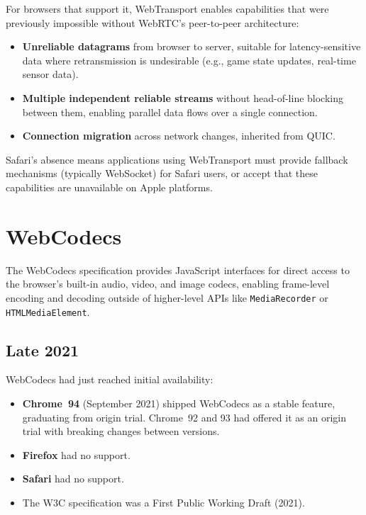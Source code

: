 \documentclass[11pt]{article}
\begin{document}
For browsers that support it, WebTransport enables capabilities that were
previously impossible without WebRTC's peer-to-peer architecture:
\begin{itemize}
  \item \textbf{Unreliable datagrams} from browser to server, suitable for
    latency-sensitive data where retransmission is undesirable (e.g., game
    state updates, real-time sensor data).
  \item \textbf{Multiple independent reliable streams} without head-of-line
    blocking between them, enabling parallel data flows over a single
    connection.
  \item \textbf{Connection migration} across network changes, inherited from
    QUIC.
\end{itemize}

Safari's absence means applications using WebTransport must provide fallback
mechanisms (typically WebSocket) for Safari users, or accept that these
capabilities are unavailable on Apple platforms.

\section{WebCodecs}

The WebCodecs specification provides JavaScript interfaces for direct access
to the browser's built-in audio, video, and image codecs, enabling
frame-level encoding and decoding outside of higher-level APIs like
\texttt{MediaRecorder} or \texttt{HTMLMediaElement}.

\subsection{Late 2021}

WebCodecs had just reached initial availability:

\begin{itemize}
  \item \textbf{Chrome~94} (September 2021) shipped WebCodecs as a stable
    feature, graduating from origin trial. Chrome~92 and 93 had offered it
    as an origin trial with breaking changes between versions.
  \item \textbf{Firefox} had no support.
  \item \textbf{Safari} had no support.
  \item The W3C specification was a First Public Working Draft (2021).
\end{itemize}
\end{document}
